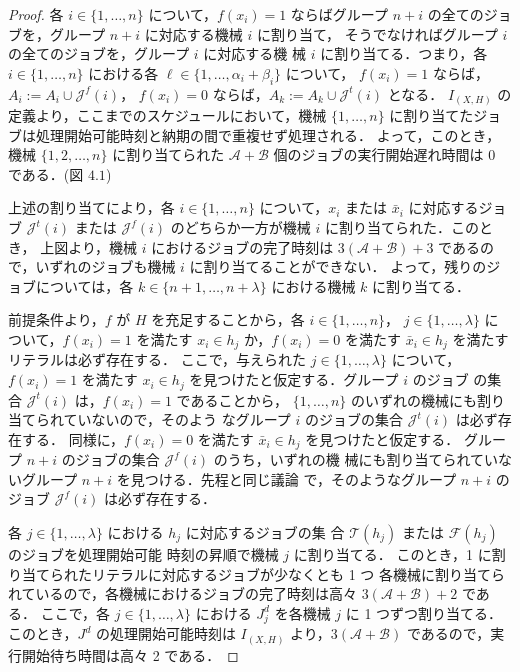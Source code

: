 \documentclass[12pt]{optlab-bachelor}
\begin{document}
\begin{proof}
  各 $i \in \{1,\ldots, n\}$ について，$f(x_i) = 1$ ならばグループ $n +
  i$ の全てのジョブを，グループ $n + i$ に対応する機械 $i$ に割り当て，
  そうでなければグループ $i$ の全てのジョブを，グループ $i$ に対応する機
  械 $i$ に割り当てる．つまり，各 $i \in \{1,\ldots, n\}$ における各
  $\ell \in \{1,\ldots,\alpha_i + \beta_i\}$ について，
  $f(x_i) = 1$ ならば，$A_i := A_i \cup \mathcal{J}^f(i)$，
  $f(x_i) = 0$ ならば，$A_k := A_k \cup \mathcal{J}^t(i)$ となる．
  $I_{(X,H)}$ の定義より，ここまでのスケジュールにおいて，機械
  $\{1,\ldots, n\}$ に割り当てたジョブは処理開始可能時刻と納期の間で重複せず処理される．
  よって，このとき，機械 $\{1,2,\ldots,n\}$ に割り当てられた
  $\mathcal{A} + \mathcal{B}$ 個のジョブの実行開始遅れ時間は $0$ である．(図 $4.1$)

  上述の割り当てにより，各 $i \in \{1,\ldots,n\}$ について，$x_i$ または
  $\bar x_i$ に対応するジョブ $\mathcal{J}^t(i)$ または
  $\mathcal{J}^f(i)$ のどちらか一方が機械 $i$ に割り当てられた．このとき，
  上図より，機械 $i$ におけるジョブの完了時刻は $3(\mathcal{A} +
  \mathcal{B}) + 3$ であるので，いずれのジョブも機械 $i$ に割り当てることができない．
  よって，残りのジョブについては，各 $k \in \{n + 1,\ldots,n +
  \lambda\}$ における機械 $k$ に割り当てる．

  前提条件より，$f$ が $H$ を充足することから，各 $i \in \{1,\ldots,n\}$，
  $j \in \{1, \ldots, \lambda \}$ について，$f(x_i) = 1$ を満たす $x_i
  \in h_j$ か，$f(x_i) = 0$ を満たす $\bar x_i \in h_j$ を満たすリテラルは必ず存在する．
  ここで，与えられた $j \in \{1, \ldots, \lambda \}$ について，$f(x_i) =
  1$ を満たす $x_i \in h_j$ を見つけたと仮定する．グループ $i$ のジョブ
  の集合 $\mathcal{J}^t(i)$ は，$f(x_i) = 1$ であることから，
  $\{1,\ldots,n\}$ のいずれの機械にも割り当てられていないので，そのよう
  なグループ $i$ のジョブの集合 $\mathcal{J}^t(i)$ は必ず存在する．
  同様に，$f(x_i) = 0$ を満たす $\bar x_i \in h_j$ を見つけたと仮定する．
  グループ $n + i$ のジョブの集合 $\mathcal{J}^f(i)$ のうち，いずれの機
  械にも割り当てられていないグループ $n + i$ を見つける．先程と同じ議論
  で，そのようなグループ $n + i$ のジョブ $\mathcal{J}^f(i)$ は必ず存在する．

  各 $j \in \{1, \ldots, \lambda \}$ における $h_j$ に対応するジョブの集
  合 $\mathcal{T}(h_j)$ または $\mathcal{F}(h_j)$ のジョブを処理開始可能
  時刻の昇順で機械 $j$ に割り当てる．
  このとき，1 に割り当てられたリテラルに対応するジョブが少なくとも 1 つ
  各機械に割り当てられているので，各機械におけるジョブの完了時刻は高々
  $3(\mathcal{A} + \mathcal{B}) + 2$ である．
  ここで，各 $j \in \{1,\ldots,\lambda\}$ における $J^d_j$ を各機械 $j$
  に 1 つずつ割り当てる．
  このとき，$J^d$ の処理開始可能時刻は $I_{(X,H)}$ より，$3(\mathcal{A}
  + \mathcal{B})$ であるので，実行開始待ち時間は高々 2 である．


\end{proof}
\end{document}
